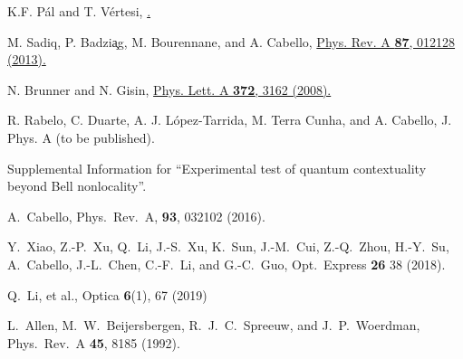 \documentclass[prl,letterpaper,english,reprint,nofootinbib,aps,superscriptaddress,showpacs,showkeys]{revtex4-1}
\theoremstyle{definition}
\theoremstyle{remark}
\begin{document}
\begin{thebibliography}{10}
 K.F. P\'al and T. V\'ertesi,
 \href{https://dx.doi.org/10.1103/PhysRevA.82.022116}{.}
 
 M. Sadiq, P. Badzi{\c a}g, M. Bourennane, and A. Cabello,
 \href{http://pra.aps.org/abstract/PRA/v87/i1/e012128}{Phys. Rev. A \textbf{87}, 012128 (2013).}





 N. Brunner and N. Gisin,
 \href{http://dx.doi.org/10.1016/j.physleta.2008.01.052}{Phys. Lett. A \textbf{372}, 3162 (2008).}

 R. Rabelo, C. Duarte, A. J. L\'opez-Tarrida, M. Terra Cunha, and A. Cabello,
 J. Phys. A (to be published).

 Supplemental Information for ``Experimental test of quantum contextuality beyond Bell nonlocality''.

 A.~Cabello,
 Phys.~Rev.~A, \textbf{93}, 032102 (2016).

 Y.~Xiao, Z.-P.~Xu, Q.~Li, J.-S.~Xu, K.~Sun, J.-M.~Cui, Z.-Q.~Zhou, H.-Y.~Su, A.~Cabello, J.-L.~Chen, C.-F.~Li, and G.-C.~Guo,
 Opt.~Express \textbf{26} 38 (2018).
 
 Q.~Li, et al.,
 Optica \textbf{6}(1), 67 (2019)


 L.~Allen, M.~W.~Beijersbergen, R.~J.~C.~Spreeuw, and J.~P.~Woerdman,
 Phys.~Rev.~A \textbf{45}, 8185 (1992).








\end{thebibliography}
\end{document}
